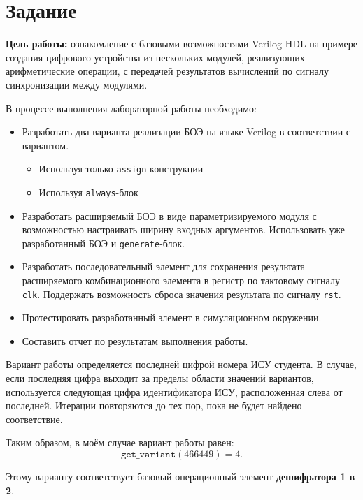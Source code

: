 \section{Задание}

\textbf{Цель работы:} ознакомление с базовыми возможностями Verilog HDL на примере создания цифрового устройства из нескольких модулей, реализующих арифметические операции, с передачей результатов вычислений по сигналу синхронизации между модулями.

В процессе выполнения лабораторной работы необходимо:
\begin{itemize}
    \item Разработать два варианта реализации БОЭ на языке Verilog в соответствии с вариантом.
    \begin{itemize}
        \item Используя только \texttt{assign} конструкции
        \item Используя \texttt{always}-блок
    \end{itemize}
    \item Разработать расширяемый БОЭ в виде параметризируемого модуля с возможностью настраивать ширину входных аргументов. Использовать уже разработанный БОЭ и \texttt{generate}-блок.
    \item Разработать последовательный элемент для сохранения результата расширяемого комбинационного элемента в регистр по тактовому сигналу \texttt{clk}. Поддержать возможность сброса значения результата по сигналу \texttt{rst}.
    \item Протестировать разработанный элемент в симуляционном окружении.
    \item Составить отчет по результатам выполнения работы.
\end{itemize}

Вариант работы определяется последней цифрой номера ИСУ студента. В случае, если последняя цифра выходит за пределы области значений вариантов, используется следующая цифра идентификатора ИСУ, расположенная слева от последней. Итерации повторяются до тех пор, пока не будет найдено соответствие.

Таким образом, в моём случае вариант работы равен:
\[
    \texttt{get\_variant}(466449) = 4.
\]

Этому варианту соответствует базовый операционный элемент \textbf{дешифратора 1 в 2}.